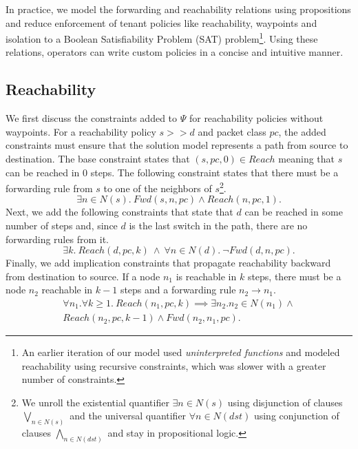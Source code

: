 In practice, we  
model the forwarding and reachability relations using propositions and
 reduce enforcement of tenant policies like reachability, waypoints 
 and isolation to a Boolean Satisfiability Problem (SAT) problem\footnote{
 	An earlier iteration of our model used \emph{uninterpreted functions} 
 	and modeled reachability using recursive constraints, 
	which was slower with a greater number of constraints.}. 
Using these
relations, operators can write custom policies in a concise and intuitive
manner. 

\subsection{Reachability} \label{sec:reach}
We first discuss the constraints added to $\Psi$
for reachability policies without waypoints.
For a reachability policy $s >> d$ and packet class $pc$, the added constraints must ensure that 
the solution model represents a path 
from source to destination. 
The base constraint states that $(s, pc,0) \in Reach$ meaning
that $s$ can be reached in $0$ steps. 
The following constraint states that there must be a forwarding rule from $s$ to one of
the neighbors of $s$\footnote{
	We unroll the existential quantifier $\exists n \in N(s)$ using disjunction of 
	clauses $\bigvee\limits_{n \in N(s)}$ and
	the universal quantifier $\forall n \in N(dst)$ using conjunction of clauses $\bigwedge\limits_{n \in N(dst)}$
	and stay in propositional logic.}.
\begin{equation} \label{eq:src}
	\exists n \in N(s).~Fwd(s, n, pc) \wedge Reach(n, pc, 1).
\end{equation}
Next, we add the following constraints that state that $d$ can be reached in some number of steps and,
since $d$ is the last switch in the path, there are no forwarding rules from it.
\begin{equation} \label{eq:dst}
	\exists k.~Reach(d, pc, k) \ \wedge \ \forall n \in N(d). \ \neg Fwd(d, n, pc).
\end{equation}
Finally, we add implication constraints that propagate reachability backward from destination to source. 
If a node $n_1$ is reachable in $k$ steps, there must be a node $n_2$ reachable in  $k-1$ steps and 
a forwarding rule $n_2 \rightarrow n_1$.
\begin{multline} \label{eq:bckprop}
\forall n_1.\forall k \geq 1.~ Reach(n_1,pc,k) \implies \exists n_2.  n_2 \in N(n_1) \wedge \\ Reach(n_2,pc,k-1) \wedge Fwd(n_2,n_1,pc).
\end{multline} 
